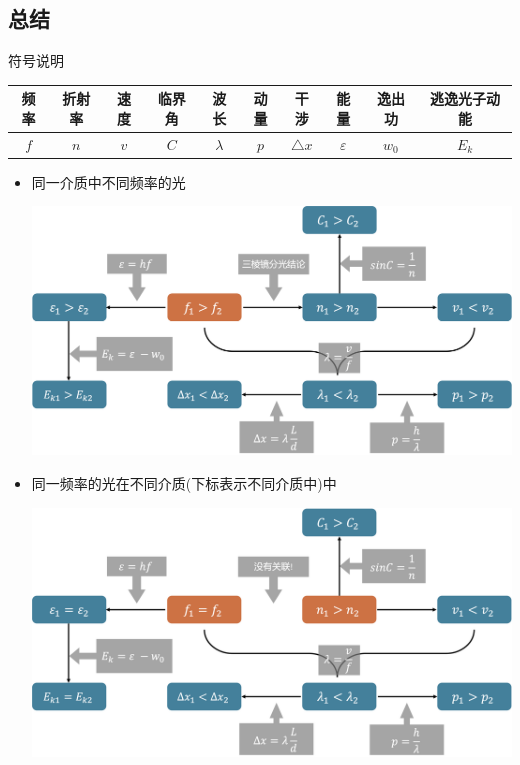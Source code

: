 \documentclass{article}
\begin{document}
\vspace{2em}

\subsection{总结}
\begin{formal}
    符号说明

    \begin{tabular}{|c|c|c|c|c|c|c|c|c|c|}
        \hline
        频率  & 折射率 & 速度  & 临界角 & 波长        & 动量  & 干涉            & 能量            & 逸出功     & 逃逸光子动能  \\
        \hline
        $f$ & $n$ & $v$ & $C$ & $\lambda$ & $p$ & $\triangle x$ & $\varepsilon$ & $w_{0}$ & $E_{k}$ \\
        \hline
    \end{tabular}

    \vspace*{2em}

    \begin{itemize}
        \item 同一介质中不同频率的光

              \vspace*{1em}
              \includegraphics[width=35em,keepaspectratio]{./pictures/2.png}

              \vspace*{2em}

        \item 同一频率的光在不同介质(下标表示不同介质中)中

              \vspace*{1em}
              \includegraphics[width=35em,keepaspectratio]{./pictures/3.png}
    \end{itemize}
\end{formal}
\end{document}
